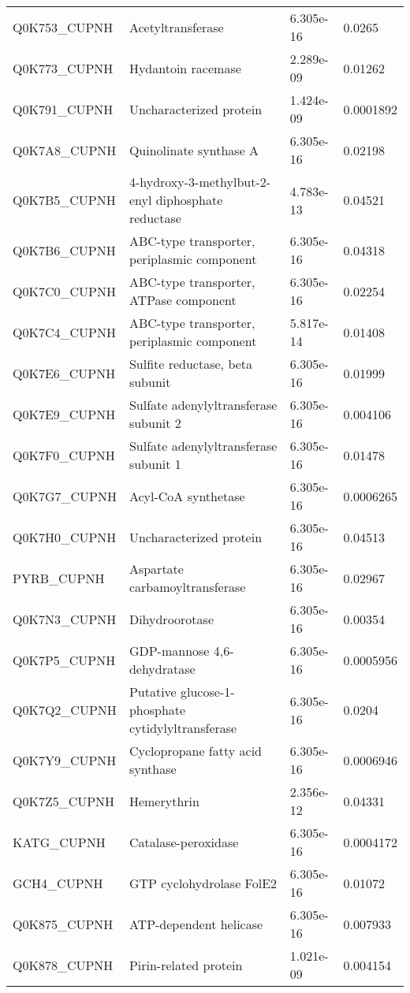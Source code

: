 \begin{center}
\begin{longtable}{ l l l l }
Q0K753\_CUPNH & Acetyltransferase& 6.305e-16 & 0.0265 \\ [0.5ex]
Q0K773\_CUPNH & Hydantoin racemase& 2.289e-09 & 0.01262 \\ [0.5ex]
Q0K791\_CUPNH & Uncharacterized protein& 1.424e-09 & 0.0001892 \\ [0.5ex]
Q0K7A8\_CUPNH & Quinolinate synthase A& 6.305e-16 & 0.02198 \\ [0.5ex]
Q0K7B5\_CUPNH & 4-hydroxy-3-methylbut-2-enyl diphosphate reductase& 4.783e-13 & 0.04521 \\ [0.5ex]
Q0K7B6\_CUPNH & ABC-type transporter, periplasmic component & 6.305e-16 & 0.04318 \\ [0.5ex]
Q0K7C0\_CUPNH & ABC-type transporter, ATPase component& 6.305e-16 & 0.02254 \\ [0.5ex]
Q0K7C4\_CUPNH & ABC-type transporter, periplasmic component& 5.817e-14 & 0.01408 \\ [0.5ex]
Q0K7E6\_CUPNH & Sulfite reductase, beta subunit& 6.305e-16 & 0.01999 \\ [0.5ex]
Q0K7E9\_CUPNH & Sulfate adenylyltransferase subunit 2& 6.305e-16 & 0.004106 \\ [0.5ex]
Q0K7F0\_CUPNH & Sulfate adenylyltransferase subunit 1& 6.305e-16 & 0.01478 \\ [0.5ex]
Q0K7G7\_CUPNH & Acyl-CoA synthetase& 6.305e-16 & 0.0006265 \\ [0.5ex]
Q0K7H0\_CUPNH & Uncharacterized protein& 6.305e-16 & 0.04513 \\ [0.5ex]
PYRB\_CUPNH & Aspartate carbamoyltransferase& 6.305e-16 & 0.02967 \\ [0.5ex]
Q0K7N3\_CUPNH & Dihydroorotase& 6.305e-16 & 0.00354 \\ [0.5ex]
Q0K7P5\_CUPNH & GDP-mannose 4,6-dehydratase& 6.305e-16 & 0.0005956 \\ [0.5ex]
Q0K7Q2\_CUPNH & Putative glucose-1-phosphate cytidylyltransferase& 6.305e-16 & 0.0204 \\ [0.5ex]
Q0K7Y9\_CUPNH & Cyclopropane fatty acid synthase& 6.305e-16 & 0.0006946 \\ [0.5ex]
Q0K7Z5\_CUPNH & Hemerythrin& 2.356e-12 & 0.04331 \\ [0.5ex]
KATG\_CUPNH & Catalase-peroxidase& 6.305e-16 & 0.0004172 \\ [0.5ex]
GCH4\_CUPNH & GTP cyclohydrolase FolE2& 6.305e-16 & 0.01072 \\ [0.5ex]
Q0K875\_CUPNH & ATP-dependent helicase & 6.305e-16 & 0.007933 \\ [0.5ex]
Q0K878\_CUPNH & Pirin-related protein& 1.021e-09 & 0.004154 \\ [0.5ex]

\end{longtable}
\end{center}
